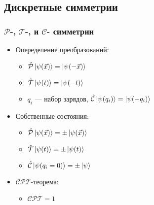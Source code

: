 \subsection{Дискретные симметрии}
\begin{frame}
    \frametitle{$\mathcal{P}$-, $\mathcal{T}$-, и $\mathcal{C}$- симметрии}
    \begin{itemize}[<+->]
        \item Опеределение преобразований:
        \begin{itemize}[<+->]
        \item[] $\hat{\mathcal{P}} \ket{\psi(\vec{x})} = \ket{\psi(-\vec{x})}$
        \item[] $\hat{\mathcal{T}} \ket{\psi(t)} = \ket{\psi(-t)}$
        \item[] $q_i$ --- набор зарядов,
        $\hat{\mathcal{C}} \ket{\psi(q_i)} = \ket{\psi(-q_i)}$
        \end{itemize}
    \item Собственные состояния:
        \begin{itemize}[<+->]
        \item[]
        $\hat{\mathcal{P}} \ket{\psi(\vec{x})} = \pm\ket{\psi(\vec{x})}$
        \item[]
        $\hat{\mathcal{T}} \ket{\psi(t)} = \pm\ket{\psi(t)}$
        \item[]
        $\hat{\mathcal{C}} \ket{\psi(q_i=0)} = \pm\ket{\psi}$
        \end{itemize}
    \item $\mathcal{CPT}$-теорема:
        \begin{itemize}[<+->]
        \item
        ${\mathcal{C}}{\mathcal{P}}{\mathcal{T}} = 1$
        \end{itemize}
    \end{itemize}
\end{frame}
